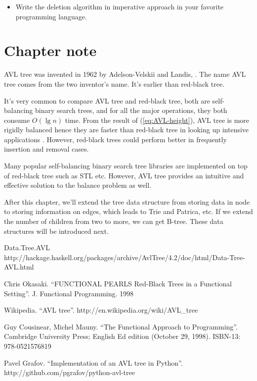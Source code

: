 \documentclass{article}
\begin{document}
\begin{Exercise}

\begin{itemize}
\item Write the deletion algorithm in imperative approach in your favorite
programming language.

\end{itemize}

\end{Exercise}


\section{Chapter note}
AVL tree was invented in 1962 by Adelson-Velskii and Landis\cite{wiki},
\cite{TFATP}. The name AVL tree comes from the two inventor's name. It's earlier than red-black tree.

It's very common to compare AVL tree and red-black tree, both are self-balancing binary search trees, and for all the major operations, they both consume $O(\lg n)$ time. From the result of (\ref{eq:AVL-height}), AVL tree is more rigidly balanced hence they are faster than red-black tree in looking up intensive applications \cite{wiki}. However, red-black trees could perform better in frequently insertion and removal cases.

Many popular self-balancing binary search tree libraries are implemented on top of red-black tree such as STL etc. However, AVL tree provides an intuitive and effective solution to the balance problem as well.

After this chapter, we'll extend the tree data structure from storing data in node to storing information on edges, which leads to Trie and Patrica, etc. If we extend the number of children from two to more, we can get B-tree. These data structures will be introduced next.

\begin{thebibliography}{99}

Data.Tree.AVL http://hackage.haskell.org/packages/archive/AvlTree/4.2/doc/html/Data-Tree-AVL.html

Chris Okasaki. ``FUNCTIONAL PEARLS Red-Black Trees in a Functional Setting''. J. Functional Programming. 1998

Wikipedia. ``AVL tree''. http://en.wikipedia.org/wiki/AVL\_tree

Guy Cousinear, Michel Mauny. ``The Functional Approach to Programming''. Cambridge University Press; English Ed edition (October 29, 1998). ISBN-13: 978-0521576819

Pavel Grafov. ``Implementation of an AVL tree in Python''. http://github.com/pgrafov/python-avl-tree
\end{thebibliography}

\ifx\wholebook\relax\else
\end{document}

